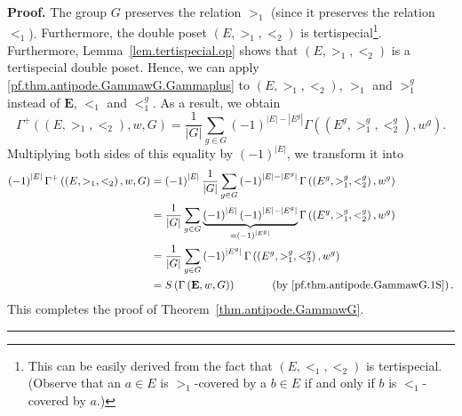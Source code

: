 \documentclass[numbers=enddot,12pt,final,onecolumn,notitlepage,abstracton]{scrartcl}
\theoremstyle{definition}
\newenvironment{proof}[1][Proof]{\noindent\textbf{#1.} }{\ \rule{0.5em}{0.5em}}
\let\sumnonlimits\sum
\renewcommand{\sum}{\sumnonlimits\limits}
\newenvironment{verlong}{}{}
\newenvironment{vershort}{}{}
\newcommand{\EE}{{\mathbf{E}}}
\begin{document}
\begin{proof}
The group $G$ preserves the relation $>_1$ (since it preserves the
relation $<_1$).
\begin{vershort}
Furthermore, the double poset $\left( E, >_1, <_2 \right)$ is
tertispecial\footnote{This can be easily derived from the fact
that $\left( E, <_1, <_2 \right)$ is tertispecial. (Observe that
an $a \in E$ is $>_1$-covered by a $b \in E$ if and only if $b$
is $<_1$-covered by $a$.)}.
\end{vershort}
\begin{verlong}
Furthermore, Lemma~\ref{lem.tertispecial.op} shows that
$\left( E, >_1, <_2 \right)$ is a tertispecial double poset.
\end{verlong}
Hence, we can apply
\eqref{pf.thm.antipode.GammawG.Gammaplus}
to $\left(  E,>_{1},<_{2}\right)  $, $>_1$ and $>_1^g$
instead of $\EE$, $<_1$ and $<_1^g$. As a result, we obtain
\[
\Gamma^{+}\left(  \left(  E,>_{1},<_{2}\right)  ,w,G\right)  =\dfrac
{1}{\left\vert G\right\vert }\sum_{g\in G}\left(  -1\right)  ^{\left\vert
E\right\vert -\left\vert E^{g}\right\vert }\Gamma\left(  \left(  E^{g}%
,>_{1}^{g},<_{2}^{g}\right)  ,w^{g}\right)  .
\]
Multiplying both sides of this equality by $\left(  -1\right)  ^{\left\vert
E\right\vert }$, we transform it into
\begin{align*}
\left(  -1\right)  ^{\left\vert E\right\vert }\Gamma^{+}\left(  \left(
E,>_{1},<_{2}\right)  ,w,G\right)
& = \left(  -1\right)  ^{\left\vert E\right\vert}
\dfrac{1}{\left\vert G\right\vert }\sum_{g\in G}
\left(  -1\right)  ^{\left\vert E\right\vert -\left\vert E^{g}\right\vert }%
\Gamma\left(  \left(
E^{g},>_{1}^{g},<_{2}^{g}\right)  ,w^{g}\right)  \\
& =\dfrac{1}{\left\vert G\right\vert
}\sum_{g\in G}\underbrace{\left(  -1\right)  ^{\left\vert E\right\vert
}\left(  -1\right)  ^{\left\vert E\right\vert -\left\vert E^{g}\right\vert }%
}_{=\left(  -1\right)  ^{\left\vert E^{g}\right\vert }}\Gamma\left(  \left(
E^{g},>_{1}^{g},<_{2}^{g}\right)  ,w^{g}\right)  \\
& =\dfrac{1}{\left\vert G\right\vert }\sum_{g\in G}\left(  -1\right)
^{\left\vert E^{g}\right\vert }\Gamma\left(  \left(  E^{g},>_{1}^{g},<_{2}%
^{g}\right)  ,w^{g}\right)  \\
& =S\left(  \Gamma\left(  { \EE },w,G\right)  \right)
\ \ \ \ \ \ \ \ \ \ 
\left(  \text{by \eqref{pf.thm.antipode.GammawG.1S}}\right)  .
\end{align*}
This completes the proof of Theorem~\ref{thm.antipode.GammawG}.
\end{proof}
\end{document}
